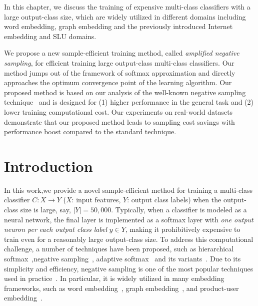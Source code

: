 In this chapter, we discuss  the training of expensive multi-class classifiers with a large output-class size, which are widely utilized in different domains including word embedding, graph embedding and the previously introduced Internet embedding and SLU domains.   

We  propose a new sample-efficient training method, called \emph{amplified negative sampling}, for efficient training  large output-class multi-class classifiers. Our method jumps out of the framework of softmax approximation and directly approaches the optimum convergence point of the learning algorithm. Our proposed method is based on our  analysis of the well-known negative sampling technique~\citep{mikolov2013distributed} and is designed for (1) higher performance in the general task and (2) lower training computational cost. Our experiments on real-world datasets demonstrate that our proposed method leads to sampling cost savings with performance boost compared to the standard technique.

\section{Introduction}

In this work,we provide a novel sample-efficient method for training a multi-class classifier $C: X \rightarrow Y$ ($X$: input features, $Y$: output class labels) when the output-class size is large, say, $\vert Y \vert = 50,000$. Typically, when a classifier is modeled as a neural network, the final layer is implemented as a softmax layer with \emph{one output neuron per each output class label} $y \in Y$, making it prohibitively expensive to train even for a reasonably large output-class size. To address this computational challenge, a number of techniques have been proposed, such as hierarchical softmax~\citep{morin2005hierarchical},negative sampling~\citep{mikolov2013efficient}, adaptive softmax~\citep{bengio2008adaptive} and its variants~\citep{rawat2019sampled,blanc2017adaptive,grave2017efficient,chen2015strategies,bai2017tapas}. Due to its simplicity and efficiency, negative sampling is one of the most popular techniques used in practice~\citep{mikolov2013distributed,wang2017knowledge,node2vec-kdd2016,barkan2016item2vec}. In particular, it is widely utilized in many embedding frameworks, such as word embedding~\citep{mikolov2013distributed}, graph embedding~\citep{node2vec-kdd2016,wang2017knowledge}, and product-user embedding~\citep{barkan2016item2vec}.



